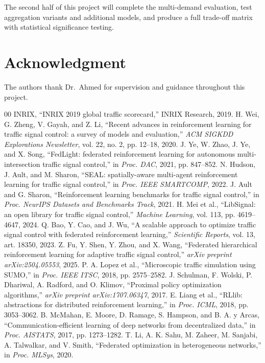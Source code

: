 \documentclass[conference]{IEEEtran}
\begin{document}
The second half of this project will complete the multi-demand evaluation, test aggregation variants and additional models, and produce a full trade-off matrix with statistical significance testing.

\section*{Acknowledgment}

The authors thank Dr.\ Ahmed for supervision and guidance throughout this project.

\begin{thebibliography}{00}
 INRIX, ``INRIX 2019 global traffic scorecard,'' INRIX Research, 2019.
 H. Wei, G. Zheng, V. Gayah, and Z. Li, ``Recent advances in reinforcement learning for traffic signal control: a survey of models and evaluation,'' \textit{ACM SIGKDD Explorations Newsletter}, vol. 22, no. 2, pp. 12--18, 2020.
 J. Ye, W. Zhao, J. Ye, and X. Song, ``FedLight: federated reinforcement learning for autonomous multi-intersection traffic signal control,'' in \textit{Proc. DAC}, 2021, pp. 847--852.
 N. Hudson, J. Ault, and M. Sharon, ``SEAL: spatially-aware multi-agent reinforcement learning for traffic signal control,'' in \textit{Proc. IEEE SMARTCOMP}, 2022.
 J. Ault and G. Sharon, ``Reinforcement learning benchmarks for traffic signal control,'' in \textit{Proc. NeurIPS Datasets and Benchmarks Track}, 2021.
 H. Mei et al., ``LibSignal: an open library for traffic signal control,'' \textit{Machine Learning}, vol. 113, pp. 4619--4647, 2024.
 Q. Bao, Y. Cao, and J. Wu, ``A scalable approach to optimize traffic signal control with federated reinforcement learning,'' \textit{Scientific Reports}, vol. 13, art. 18350, 2023.
 Z. Fu, Y. Shen, Y. Zhou, and X. Wang, ``Federated hierarchical reinforcement learning for adaptive traffic signal control,'' \textit{arXiv preprint arXiv:2504.05553}, 2025.
 P. A. Lopez et al., ``Microscopic traffic simulation using SUMO,'' in \textit{Proc. IEEE ITSC}, 2018, pp. 2575--2582.
 J. Schulman, F. Wolski, P. Dhariwal, A. Radford, and O. Klimov, ``Proximal policy optimization algorithms,'' \textit{arXiv preprint arXiv:1707.06347}, 2017.
 E. Liang et al., ``RLlib: abstractions for distributed reinforcement learning,'' in \textit{Proc. ICML}, 2018, pp. 3053--3062.
 B. McMahan, E. Moore, D. Ramage, S. Hampson, and B. A. y Arcas, ``Communication-efficient learning of deep networks from decentralized data,'' in \textit{Proc. AISTATS}, 2017, pp. 1273--1282.
 T. Li, A. K. Sahu, M. Zaheer, M. Sanjabi, A. Talwalkar, and V. Smith, ``Federated optimization in heterogeneous networks,'' in \textit{Proc. MLSys}, 2020.
\end{thebibliography}
\end{document}
